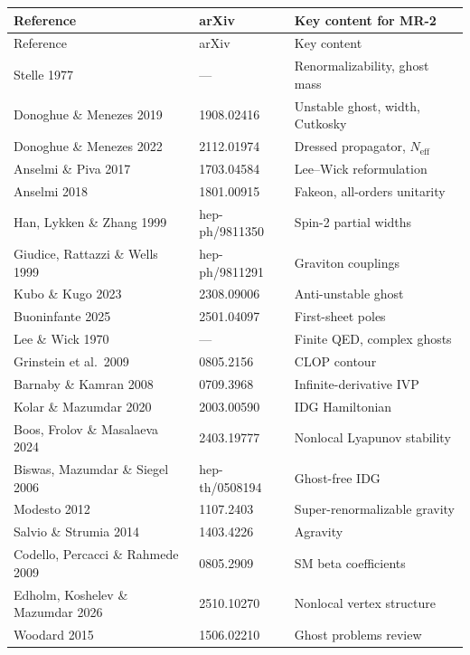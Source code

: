 \documentclass[11pt,a4paper]{article}
\theoremstyle{plain}
\theoremstyle{definition}
\theoremstyle{remark}
\newcommand{\Neff}{N_{\mathrm{eff}}}
\begin{document}
\begin{center}
\begin{longtable}{lll}
\toprule
Reference & arXiv & Key content for MR-2 \\
\midrule
\endfirsthead
\toprule
Reference & arXiv & Key content \\
\midrule
\endhead
Stelle 1977 & --- & Renormalizability, ghost mass \\
Donoghue \& Menezes 2019 & 1908.02416 & Unstable ghost, width, Cutkosky \\
Donoghue \& Menezes 2022 & 2112.01974 & Dressed propagator, $\Neff$ \\
Anselmi \& Piva 2017 & 1703.04584 & Lee--Wick reformulation \\
Anselmi 2018 & 1801.00915 & Fakeon, all-orders unitarity \\
Han, Lykken \& Zhang 1999 & hep-ph/9811350 & Spin-2 partial widths \\
Giudice, Rattazzi \& Wells 1999 & hep-ph/9811291 & Graviton couplings \\
Kubo \& Kugo 2023 & 2308.09006 & Anti-unstable ghost \\
Buoninfante 2025 & 2501.04097 & First-sheet poles \\
Lee \& Wick 1970 & --- & Finite QED, complex ghosts \\
Grinstein et al.\ 2009 & 0805.2156 & CLOP contour \\
Barnaby \& Kamran 2008 & 0709.3968 & Infinite-derivative IVP \\
Kolar \& Mazumdar 2020 & 2003.00590 & IDG Hamiltonian \\
Boos, Frolov \& Masalaeva 2024 & 2403.19777 & Nonlocal Lyapunov stability \\
Biswas, Mazumdar \& Siegel 2006 & hep-th/0508194 & Ghost-free IDG \\
Modesto 2012 & 1107.2403 & Super-renormalizable gravity \\
Salvio \& Strumia 2014 & 1403.4226 & Agravity \\
Codello, Percacci \& Rahmede 2009 & 0805.2909 & SM beta coefficients \\
Edholm, Koshelev \& Mazumdar 2026 & 2510.10270 & Nonlocal vertex structure \\
Woodard 2015 & 1506.02210 & Ghost problems review \\
\bottomrule
\end{longtable}
\end{center}


\end{document}
